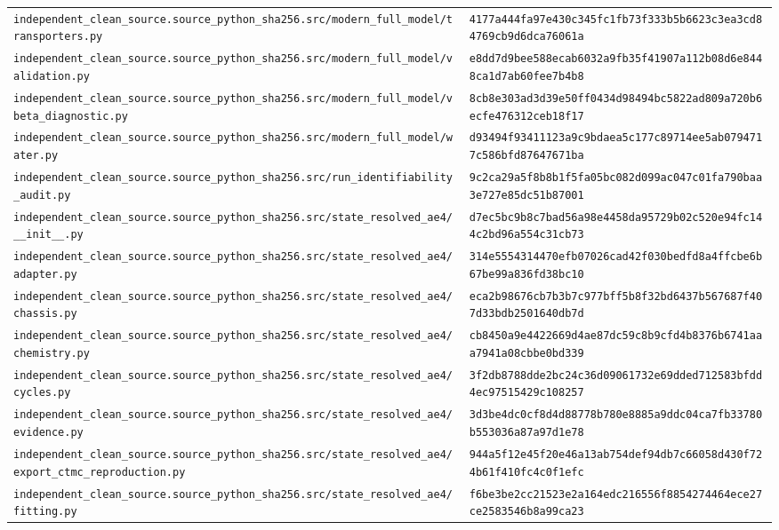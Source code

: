 \begin{longtable}{p{.46\linewidth}p{.46\linewidth}}
\nolinkurl{independent_clean_source.source_python_sha256.src/modern_full_model/transporters.py} & \nolinkurl{4177a444fa97e430c345fc1fb73f333b5b6623c3ea3cd84769cb9d6dca76061a} \\
\nolinkurl{independent_clean_source.source_python_sha256.src/modern_full_model/validation.py} & \nolinkurl{e8dd7d9bee588ecab6032a9fb35f41907a112b08d6e8448ca1d7ab60fee7b4b8} \\
\nolinkurl{independent_clean_source.source_python_sha256.src/modern_full_model/vbeta_diagnostic.py} & \nolinkurl{8cb8e303ad3d39e50ff0434d98494bc5822ad809a720b6ecfe476312ceb18f17} \\
\nolinkurl{independent_clean_source.source_python_sha256.src/modern_full_model/water.py} & \nolinkurl{d93494f93411123a9c9bdaea5c177c89714ee5ab0794717c586bfd87647671ba} \\
\nolinkurl{independent_clean_source.source_python_sha256.src/run_identifiability_audit.py} & \nolinkurl{9c2ca29a5f8b8b1f5fa05bc082d099ac047c01fa790baa3e727e85dc51b87001} \\
\nolinkurl{independent_clean_source.source_python_sha256.src/state_resolved_ae4/__init__.py} & \nolinkurl{d7ec5bc9b8c7bad56a98e4458da95729b02c520e94fc144c2bd96a554c31cb73} \\
\nolinkurl{independent_clean_source.source_python_sha256.src/state_resolved_ae4/adapter.py} & \nolinkurl{314e5554314470efb07026cad42f030bedfd8a4ffcbe6b67be99a836fd38bc10} \\
\nolinkurl{independent_clean_source.source_python_sha256.src/state_resolved_ae4/chassis.py} & \nolinkurl{eca2b98676cb7b3b7c977bff5b8f32bd6437b567687f407d33bdb2501640db7d} \\
\nolinkurl{independent_clean_source.source_python_sha256.src/state_resolved_ae4/chemistry.py} & \nolinkurl{cb8450a9e4422669d4ae87dc59c8b9cfd4b8376b6741aaa7941a08cbbe0bd339} \\
\nolinkurl{independent_clean_source.source_python_sha256.src/state_resolved_ae4/cycles.py} & \nolinkurl{3f2db8788dde2bc24c36d09061732e69dded712583bfdd4ec97515429c108257} \\
\nolinkurl{independent_clean_source.source_python_sha256.src/state_resolved_ae4/evidence.py} & \nolinkurl{3d3be4dc0cf8d4d88778b780e8885a9ddc04ca7fb33780b553036a87a97d1e78} \\
\nolinkurl{independent_clean_source.source_python_sha256.src/state_resolved_ae4/export_ctmc_reproduction.py} & \nolinkurl{944a5f12e45f20e46a13ab754def94db7c66058d430f724b61f410fc4c0f1efc} \\
\nolinkurl{independent_clean_source.source_python_sha256.src/state_resolved_ae4/fitting.py} & \nolinkurl{f6be3be2cc21523e2a164edc216556f8854274464ece27ce2583546b8a99ca23} \\

\end{longtable}
